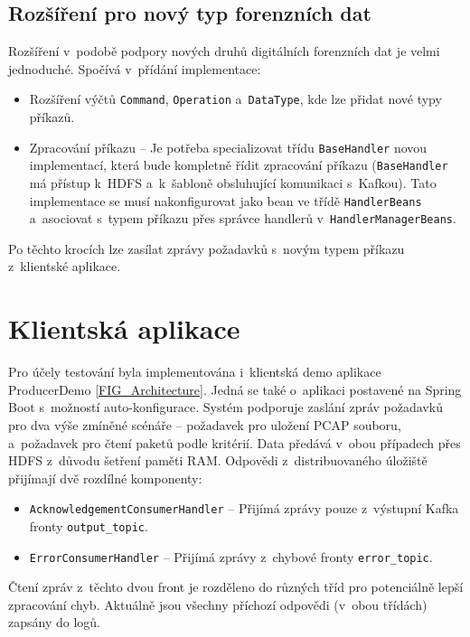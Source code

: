 \subsection{Rozšíření pro nový typ forenzních dat}
Rozšíření v~podobě podpory nových druhů digitálních forenzních dat je velmi jednoduché. Spočívá v~přídání implementace:

\begin{itemize}
    \item Rozšíření výčtů \texttt{Command}, \texttt{Operation} a~\texttt{DataType}, kde lze přidat nové typy příkazů.
    
    \item Zpracování příkazu -- Je potřeba specializovat třídu \texttt{BaseHandler} novou implementací, která bude kompletně řídit zpracování příkazu (\texttt{BaseHandler} má přístup k~HDFS a~k~šabloně obsluhující komunikaci s~Kafkou). Tato implementace se musí nakonfigurovat jako bean ve třídě \texttt{HandlerBeans} a~asociovat s~typem příkazu přes správce handlerů v~\texttt{HandlerManagerBeans}.
\end{itemize}

\noindent Po těchto krocích lze zasílat zprávy požadavků s~novým typem příkazu z~klientské aplikace.

\section{Klientská aplikace}
Pro účely testování byla implementována i~klientská demo aplikace ProducerDemo \ref{FIG_Architecture}. 
Jedná se také o~aplikaci postavené na Spring Boot s~možností auto-konfigurace. Systém podporuje zaslání zpráv požadavků pro dva výše zmíněné scénáře -- požadavek pro uložení PCAP souboru, a~požadavek pro čtení paketů podle kritérií. Data předává v~obou případech přes HDFS z~důvodu šetření paměti RAM. Odpovědi z~distribuovaného úložiště přijímají dvě rozdílné komponenty:

\begin{itemize}
    \item \texttt{AcknowledgementConsumerHandler} -- Přijímá zprávy pouze z~výstupní Kafka fronty \texttt{output\_topic}.
    
    \item \texttt{ErrorConsumerHandler} -- Přijímá zprávy z~chybové fronty \texttt{error\_topic}.
\end{itemize}

\noindent Čtení zpráv z~těchto dvou front je rozděleno do různých tříd pro potenciálně lepší zpracování chyb. Aktuálně jsou všechny příchozí odpovědi (v~obou třídách) zapsány do logů.


